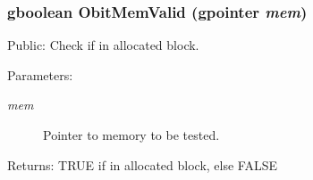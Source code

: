 \subsubsection{\setlength{\rightskip}{0pt plus 5cm}gboolean Obit\-Mem\-Valid (gpointer {\em mem})}\label{ObitMem_8c_a16}


Public: Check if in allocated block. 

\begin{Desc}
\item[Parameters:]
\begin{description}
\item[{\em mem}]Pointer to memory to be tested. \end{description}
\end{Desc}
\begin{Desc}
\item[Returns:]TRUE if in allocated block, else FALSE \end{Desc}
